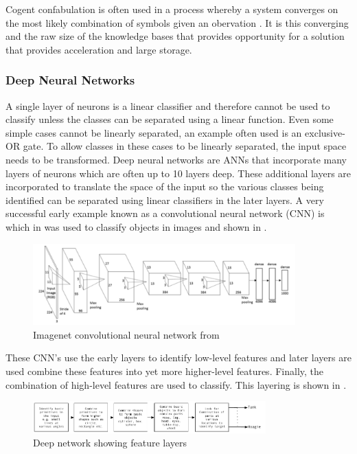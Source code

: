Cogent confabulation is often used in a process whereby a system converges on the most likely combination of symbols given an obervation \cite{qiu2013parallel}.
It is this converging and the raw size of the knowledge bases that provides opportunity for a solution that provides acceleration and large storage.


\subsubsection*{Deep Neural Networks}

A single layer of neurons is a linear classifier and therefore cannot be used to classify unless the classes can be separated using a linear function.
Even some simple cases cannot be linearly separated, an example often used is an exclusive-OR gate.
To allow classes in these cases to be linearly separated, the input space needs to be transformed.
Deep neural networks are ANNs that incorporate many layers of neurons which are often up to 10 layers deep.
These additional layers are incorporated to translate the space of the input so the various classes being identified can be separated using linear classifiers in the later
layers.
A very successful early example known as a convolutional neural network (CNN) is which in \cite{krizhevsky2012imagenet} was used to classify objects in images
and shown in .
\begin{figure}[hbtp]
\centering
\includegraphics[width=0.9\textwidth]{Chapter-1/figs/deepNetworkShowingFeatureLayers}
\captionsetup{justification=centering, skip=-5pt}
\caption{Imagenet convolutional neural network from \cite{krizhevsky2012imagenetPreso}}
\label{fig:simple Imagenet network}
\end{figure}
These CNN's use the early layers to identify low-level features and later layers are used combine these features into yet more higher-level features.
Finally, the combination of high-level features are used to classify.
This layering is shown in .
\begin{figure}[hbtp]
\centering
\includegraphics[width=0.8\textwidth]{Chapter-1/figs/deepNetworkBlockDiagram}
\captionsetup{justification=centering, skip=5pt}
\caption{Deep network showing feature layers}
\label{fig:Deep network showing feature layers}
\end{figure}
